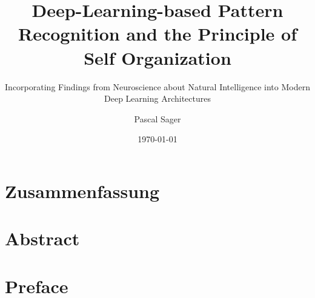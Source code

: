 \documentclass[
    fontsize=10pt,
    twoside=true,
    numbers=noenddot
]{cls/phdbyphd}
\theoremstyle{plain}
\begin{document}

\titlehead{Master of Science in Engineering with Specialisation in Data Science}

\subject{Master Thesis}
\title[Deep-Learning-based Pattern Recognition and the Principle of Self Organization]{
    Deep-Learning-based Pattern Recognition and the Principle of Self Organization
}
\subtitle{Incorporating Findings from Neuroscience about Natural Intelligence into Modern Deep Learning Architectures}

\author[Pascal Sager]{Pascal Sager}
\date{\today}

\publishers{Zurich University of Applied Sciences}

\frontmatter
{}


\maketitle


\setlength{\textheight}{23cm}

\chapter*{Zusammenfassung}
    
    
\chapter*{Abstract}
    

\chapter*{Preface}
    
\end{document}

